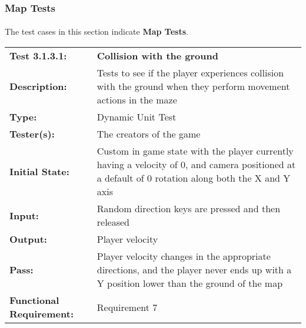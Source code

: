 \documentclass[12pt, titlepage]{article}
\begin{document}
\subsubsection{Map Tests}
\paragraph{}The test cases in this section indicate \textbf{Map Tests}.

\begin{mdframed}[linewidth=1pt]
\begin{tabularx}{\textwidth}{@{}p{3cm}X@{}}
{\bf Test 3.1.3.1:} & {\bf Collision with the ground}\\[\baselineskip]
{\bf Description:} & Tests to see if the player experiences collision with the ground when they perform movement actions in the maze\\[0.5\baselineskip]
{\bf Type:} & Dynamic Unit Test\\[0.5\baselineskip]
{\bf Tester(s):} & The creators of the game\\[0.5\baselineskip]
{\bf Initial State:} & Custom in game state with the player currently having a velocity of 0, and camera positioned at a default of 0 rotation along both the X and Y axis\\[0.5\baselineskip]
{\bf Input:} & Random direction keys are pressed and then released \\[0.5\baselineskip]
{\bf Output:} & Player velocity\\[0.5\baselineskip]
{\bf Pass:} & Player velocity changes in the appropriate directions, and the player never ends up with a Y position lower than the ground of the map \\[0.5\baselineskip]
{\bf Functional Requirement:} & Requirement 7
\end{tabularx}
\end{mdframed}
\end{document}

